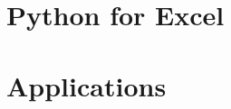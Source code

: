 \documentclass{book} %
\begin{document}
\chapter{Python for Excel}


\chapter{Applications}



\backmatter

\printbibliography
\end{document}
